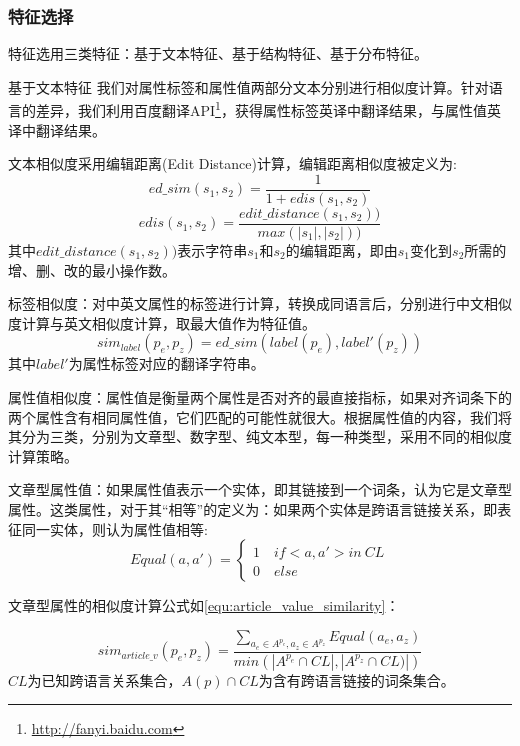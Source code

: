 \subsubsection{特征选择}
特征选用三类特征：基于文本特征、基于结构特征、基于分布特征。

{\heiti 基于文本特征} 我们对属性标签和属性值两部分文本分别进行相似度计算。针对语言的差异，我们利用百度翻译API\footnote{\url{http://fanyi.baidu.com}}，获得属性标签英译中翻译结果，与属性值英译中翻译结果。

文本相似度采用编辑距离(Edit Distance)计算，编辑距离相似度被定义为:
\begin{equation}
ed\_sim(s_1, s_2) = \frac{1}{1+edis(s_1,s_2)}
\end{equation}
\begin{equation}
edis(s_1,s_2)=\frac{edit\_distance(s_1, s_2))}{max(\left| s_1 \right |,\left | s_2 \right |))}
\end{equation}
其中$edit\_distance(s_1, s_2))$表示字符串$s_1$和$s_2$的编辑距离，即由$s_1$变化到$s_2$所需的增、删、改的最小操作数。

{\heiti 标签相似度：}对中英文属性的标签进行计算，转换成同语言后，分别进行中文相似度计算与英文相似度计算，取最大值作为特征值。
\begin{equation}
\label{}
sim_{label}(p_e, p_z) = ed\_sim(label(p_e), label'(p_z))
\end{equation}
其中$label'$为属性标签对应的翻译字符串。

{\heiti 属性值相似度：}属性值是衡量两个属性是否对齐的最直接指标，如果对齐词条下的两个属性含有相同属性值，它们匹配的可能性就很大。根据属性值的内容，我们将其分为三类，分别为文章型、数字型、纯文本型，每一种类型，采用不同的相似度计算策略。

文章型属性值：如果属性值表示一个实体，即其链接到一个词条，认为它是文章型属性。这类属性，对于其“相等”的定义为：如果两个实体是跨语言链接关系，即表征同一实体，则认为属性值相等:
\begin{equation}
Equal(a,a')=\left\{\begin{matrix}
1 \quad  if <a,a'> in \ CL\\
0 \quad  else
\end{matrix}\right.
\end{equation}

文章型属性的相似度计算公式如\ref{equ:article_value_similarity}：

\begin{equation}
\label{equ:article_value_similarity}
sim_{article\_v}(p_e, p_z) = \frac{\sum_{a_e\in A^{p_e}, a_z \in A^{p_z}} Equal(a_e, a_z)}{min(\left| A^{p_e}\cap CL \right|, \left|A^{p_z} \cap CL) \right|)}
\end{equation}
$CL$为已知跨语言关系集合，$A(p)\cap CL$为含有跨语言链接的词条集合。

